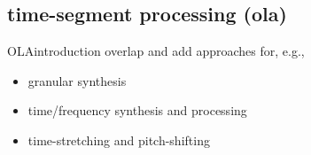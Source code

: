     \subsection{time-segment processing (ola)}
    \begin{frame}{OLA}{introduction}
        overlap and add approaches for, e.g.,
        
        \begin{itemize}
            \item   granular synthesis
            \item   time/frequency synthesis and processing
            \item   {time-stretching and pitch-shifting}
        \end{itemize}
    \end{frame}

